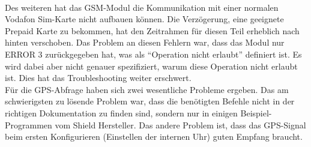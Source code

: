 \\
Des weiteren hat das GSM-Modul die Kommunikation mit einer normalen Vodafon Sim-Karte nicht aufbauen können. Die Verzögerung, eine geeignete Prepaid Karte zu bekommen, hat den Zeitrahmen für diesen Teil erheblich nach hinten verschoben.
Das Problem an diesen Fehlern war, dass das Modul nur ERROR 3 zurückgegeben hat, was als “Operation nicht erlaubt” definiert ist. Es wird dabei aber nicht genauer spezifiziert, warum diese Operation nicht erlaubt ist. Dies hat das Troubleshooting weiter erschwert.
\\
Für die GPS-Abfrage haben sich zwei wesentliche Probleme ergeben. Das am schwierigsten zu lösende Problem war, dass die benötigten Befehle nicht in der richtigen Dokumentation zu finden sind, sondern nur in einigen Beispiel-Programmen vom Shield Hersteller. Das andere Problem ist, dass das GPS-Signal beim ersten Konfigurieren (Einstellen der internen Uhr) guten Empfang braucht.

